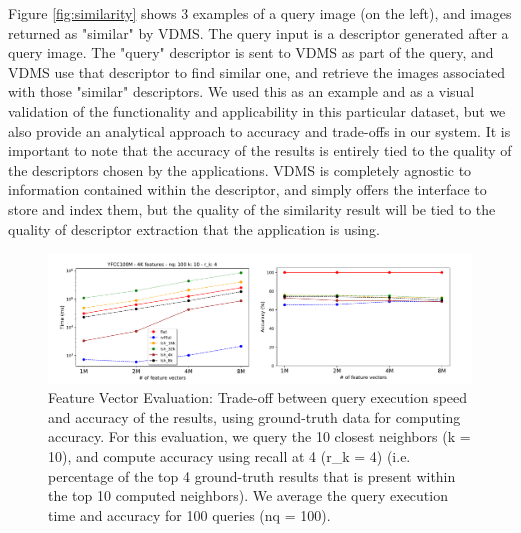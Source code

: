 Figure \ref{fig:similarity} shows 3 examples of a query image (on the left),
and images returned as "similar" by VDMS.
The query input is a descriptor generated after a query image. The "query"
descriptor is sent to VDMS as part of the query, and VDMS use that descriptor
to find similar one, and retrieve the images associated with those "similar"
descriptors. We used this as an example and as a visual validation of the
functionality and applicability in this particular dataset, but we also
provide an analytical approach to accuracy and trade-offs in our system.
It is important to note that the accuracy of the results is entirely tied
to the quality of the descriptors chosen by the applications.
VDMS is completely agnostic to information contained within the descriptor,
and simply offers the interface to store and index them, but the quality
of the similarity result will be tied to the quality of descriptor extraction
that the application is using.


\begin{figure}[]
\centering
\includegraphics[width=\textwidth]{figures/features_alternatives}
\caption{Feature Vector Evaluation: Trade-off between query execution speed
and accuracy of the results, using ground-truth data for computing accuracy.
For this evaluation, we query the 10 closest neighbors (k = 10), and compute
accuracy using recall at 4 (r\_k = 4) (i.e. percentage of the top 4 ground-truth
results that is present within the top 10 computed neighbors).
We average the query execution time and accuracy for 100 queries (nq = 100).}
\label{fig:features_eval}
\end{figure}

